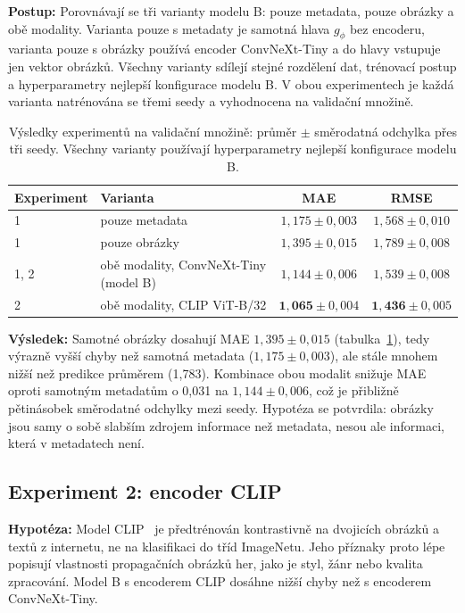 \textbf{Postup:} Porovnávají se tři varianty modelu B: pouze metadata, pouze obrázky a obě
modality. Varianta pouze s metadaty je samotná hlava $g_\phi$ bez encoderu, varianta pouze
s obrázky používá encoder ConvNeXt-Tiny a do hlavy vstupuje jen vektor obrázků. Všechny varianty
sdílejí stejné rozdělení dat, trénovací postup a hyperparametry nejlepší konfigurace modelu B.
V obou experimentech je každá varianta natrénována se třemi seedy a vyhodnocena na validační
množině.

\begin{table}[h]
    \centering
    \begin{tabular}{llcc}
        \toprule
        Experiment & Varianta & MAE & RMSE \\
        \midrule
        1 & pouze metadata & $1{,}175 \pm 0{,}003$ & $1{,}568 \pm 0{,}010$ \\
        1 & pouze obrázky & $1{,}395 \pm 0{,}015$ & $1{,}789 \pm 0{,}008$ \\
        1, 2 & obě modality, ConvNeXt-Tiny (model B) & $1{,}144 \pm 0{,}006$ & $1{,}539 \pm 0{,}008$ \\
        2 & obě modality, CLIP ViT-B/32 & $\mathbf{1{,}065} \pm 0{,}004$ & $\mathbf{1{,}436} \pm 0{,}005$ \\
        \bottomrule
    \end{tabular}
    \caption{Výsledky experimentů na validační množině: průměr $\pm$ směrodatná odchylka přes tři
    seedy. Všechny varianty používají hyperparametry nejlepší konfigurace modelu B.}
    \label{tab:experimenty}
\end{table}

\textbf{Výsledek:} Samotné obrázky dosahují MAE $1{,}395 \pm 0{,}015$ (tabulka~\ref{tab:experimenty}),
tedy výrazně vyšší chyby než samotná metadata ($1{,}175 \pm 0{,}003$), ale stále mnohem nižší
než predikce průměrem (1,783). Kombinace obou modalit snižuje MAE oproti samotným metadatům
o 0,031 na $1{,}144 \pm 0{,}006$, což je přibližně pětinásobek směrodatné odchylky mezi seedy.
Hypotéza se potvrdila: obrázky jsou samy o sobě slabším zdrojem informace než metadata,
nesou ale informaci, která v metadatech není.

\subsection*{Experiment 2: encoder CLIP}

\textbf{Hypotéza:} Model CLIP~\cite{radford2021clip} je předtrénován kontrastivně na dvojicích
obrázků a textů z internetu, ne na klasifikaci do tříd ImageNetu. Jeho příznaky proto lépe
popisují vlastnosti propagačních obrázků her, jako je styl, žánr nebo kvalita zpracování.
Model B s encoderem CLIP dosáhne nižší chyby než s encoderem ConvNeXt-Tiny.

